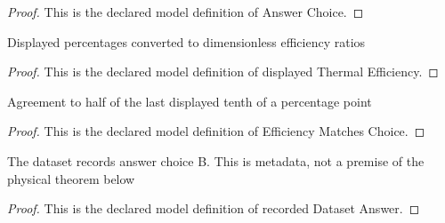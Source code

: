 \begin{proof}
  This is the declared model definition of Answer Choice.
\end{proof}
\begin{definition}
  \label{def:physics:phyx-mini-0349:phyxminiproblems-problemphyxmini0349-displayedthermalefficiency}
  Displayed percentages converted to dimensionless efficiency ratios
\end{definition}
\begin{proof}
  This is the declared model definition of displayed Thermal Efficiency.
\end{proof}
\begin{definition}
  \label{def:physics:phyx-mini-0349:phyxminiproblems-problemphyxmini0349-efficiencymatcheschoice}
  Agreement to half of the last displayed tenth of a percentage point
\end{definition}
\begin{proof}
  This is the declared model definition of Efficiency Matches Choice.
\end{proof}
\begin{definition}
  \label{def:physics:phyx-mini-0349:phyxminiproblems-problemphyxmini0349-recordeddatasetanswer}
  The dataset records answer choice B. This is metadata, not a premise of the physical theorem below
\end{definition}
\begin{proof}
  This is the declared model definition of recorded Dataset Answer.
\end{proof}
